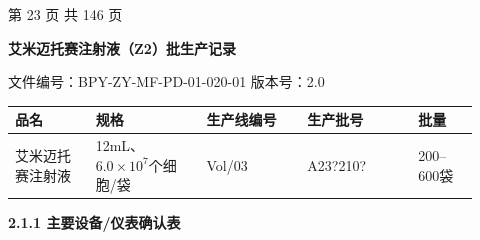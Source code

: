 \documentclass[UTF8,10pt,a4paper,fontset=fandol]{ctexart}
\newcommand{\fieldvalue}[1]{#1}
\newcommand{\handwritten}[1]{#1}
\begin{document}
\vfill
\begin{center}
第 23 页 共 146 页
\end{center}

\newpage

\begin{center}
\textbf{艾米迈托赛注射液（Z2）批生产记录}
\end{center}

\noindent
文件编号：BPY-ZY-MF-PD-01-020-01 \hfill 版本号：2.0

\begin{center}
\begin{tabular}{|p{0.16\linewidth}|p{0.22\linewidth}|p{0.20\linewidth}|p{0.22\linewidth}|p{0.12\linewidth}|}
\hline
品名 & 规格 & 生产线编号 & 生产批号 & 批量\\
\hline
艾米迈托赛注射液 & 12mL、$6.0\times10^7$个细胞/袋 &
\fieldvalue{\handwritten{Vol/03}} &
\fieldvalue{\handwritten{A23?210?}} &
200--600袋\\
\hline
\end{tabular}
\end{center}

\noindent\textbf{2.1.1 主要设备/仪表确认表}
\end{document}
